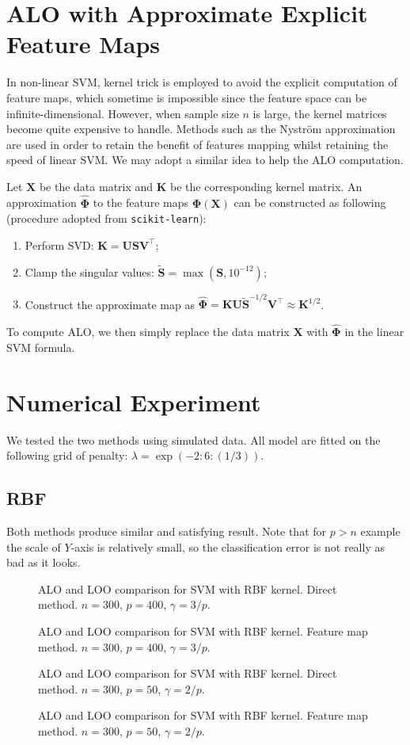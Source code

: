 \documentclass[11pt]{article}
\newcommand{\bK}{\bm{K}}
\newcommand{\bX}{\bm{X}}
\newcommand{\bPhi}{\bm{\Phi}}
\begin{document}
\section{ALO with Approximate Explicit Feature Maps}
In non-linear SVM, kernel trick is employed to avoid the explicit computation of feature maps, which sometime is impossible since the feature space can be infinite-dimensional. However, when sample size \(n\) is large, the kernel matrices become quite expensive to handle. Methods such as the Nystr\"{o}m approximation are used in order to retain the benefit of features mapping whilst retaining the speed of linear SVM. We may adopt a similar idea to help the ALO computation.

Let \(\bX\) be the data matrix and \(\bK\) be the corresponding kernel matrix. An approximation \(\hat{\bPhi}\) to the feature maps \(\bPhi(\bX)\) can be constructed as following (procedure adopted from \verb|scikit-learn|):
	\begin{enumerate}
		\item Perform SVD: \(\bK=\bm{U}\bm{S}\bm{V}^\top\);
		\item Clamp the singular values: \(\tilde{\bm{S}}=\max(\bm{S}, 10^{-12})\);
		\item Construct the approximate map as \(\hat{\bPhi}=\bK\bm{U}\tilde{\bm{S}}^{-1/2}\bm{V}^\top\approx\bK^{1/2}\).
	\end{enumerate}
To compute ALO, we then simply replace the data matrix \(\bX\) with \(\hat{\bPhi}\) in the linear SVM formula.

\section{Numerical Experiment}
We tested the two methods using simulated data. All model are fitted on the following grid of penalty: \(\lambda=\exp(-2:6:(1/3))\).
\subsection{RBF}
Both methods produce similar and satisfying result. Note that for \(p>n\) example the scale of \(Y\)-axis is relatively small, so the classification error is not really as bad as it looks.
\begin{figure}[H]
	\centering
	
	\caption{ALO and LOO comparison for SVM with RBF kernel. Direct method. \(n=300\), \(p=400\), \(\gamma=3/p\).}
\end{figure}
\begin{figure}[H]
	\centering
	
	\caption{ALO and LOO comparison for SVM with RBF kernel. Feature map method. \(n=300\), \(p=400\), \(\gamma=3/p\).}
\end{figure}
\begin{figure}[H]
	\centering
	
	\caption{ALO and LOO comparison for SVM with RBF kernel. Direct method. \(n=300\), \(p=50\), \(\gamma=2/p\).}
\end{figure}
\begin{figure}[H]
	\centering
	
	\caption{ALO and LOO comparison for SVM with RBF kernel. Feature map method. \(n=300\), \(p=50\), \(\gamma=2/p\).}
\end{figure}
\end{document}
